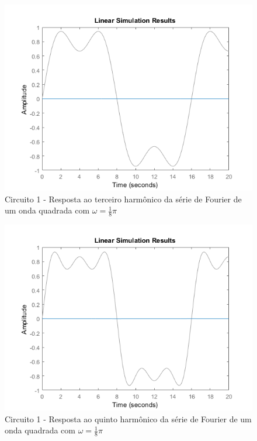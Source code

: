 \documentclass[a4paper, 12pt]{article}
\begin{document}
			\begin{figure}[!ht]
				\centering
				\includegraphics[scale=0.71]{img/1k_circ1.png}
				\caption{Circuito 1 - Resposta ao terceiro harmônico da série de Fourier de um onda quadrada com $\omega = \frac{1}{8}\pi$}	
			\end{figure}			
			\begin{figure}[!ht]
				\centering
				\includegraphics[scale=0.71]{img/1l_circ1.png}
				\caption{Circuito 1 - Resposta ao quinto harmônico da série de Fourier de um onda quadrada com $\omega = \frac{1}{8}\pi$}	
			\end{figure}				
\end{document}
